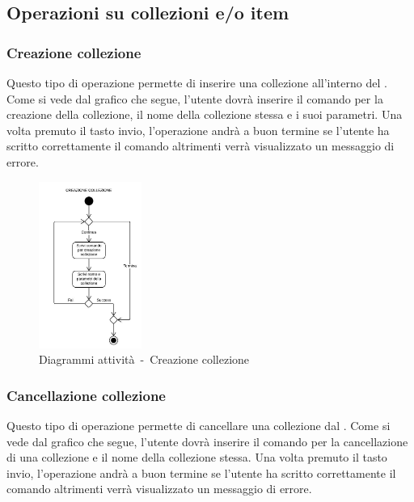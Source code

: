 \documentclass{scalatekids-article}
\begin{document}
\subsection{Operazioni su collezioni e/o item}
\subsubsection{Creazione collezione}

Questo tipo di operazione permette di inserire una collezione all'interno del
. Come si vede dal grafico che segue, l'utente dovrà inserire il
comando per la creazione della collezione, il nome della collezione stessa e i
suoi parametri. Una volta premuto il tasto invio, l'operazione andrà a buon
termine se l'utente ha scritto correttamente il comando altrimenti verrà
visualizzato un messaggio di errore.

\begin{figure}[H]
  \begin{center}
    \includegraphics[width=0.3\textwidth, keepaspectratio]{img/diagrammiAttivita/creazioneCollezione.jpeg}
    \caption{Diagrammi attività\ -\ Creazione collezione}
  \end{center}
\end{figure}

\subsubsection{Cancellazione collezione}

Questo tipo di operazione permette di cancellare una collezione dal .
Come si vede dal grafico che segue, l'utente dovrà inserire il comando per la
cancellazione di una collezione e il nome della collezione stessa. Una volta
premuto il tasto invio, l'operazione andrà a buon termine se l'utente ha
scritto correttamente il comando altrimenti verrà visualizzato un messaggio di
errore.
\end{document}

